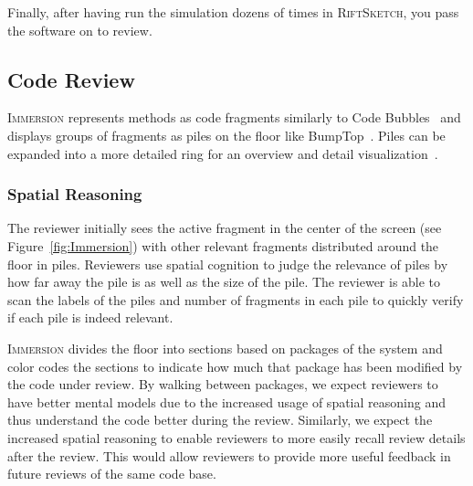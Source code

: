 \documentclass[conference]{IEEEtran}
\begin{document}
Finally, after having run the simulation dozens of times in \textsc{RiftSketch}, you pass the software on to review.




\subsection{Code Review}


\textsc{Immersion} represents methods as code fragments similarly to Code Bubbles~\cite{Bragdon:CodeBubbles} and displays groups of fragments as piles on the floor like BumpTop~\cite{Agarawala:BumpTop}.
Piles can be expanded into a more detailed ring for an overview and detail visualization~\cite{Shneiderman:InfoVisTaxonomy}.






\subsubsection{Spatial Reasoning}

The reviewer initially sees the active fragment in the center of the screen (see Figure~\ref{fig:Immersion}) with other relevant fragments distributed around the floor in piles. 
Reviewers use spatial cognition to judge the relevance of piles by how far away the pile is as well as the size of the pile.
The reviewer is able to scan the labels of the piles and number of fragments in each pile to quickly verify if each pile is indeed relevant.



\textsc{Immersion} divides the floor into sections based on packages of the system and color codes the sections to indicate how much that package has been modified by the code under review.
By walking between packages, we expect reviewers to have better mental models due to the increased usage of spatial reasoning and thus understand the code better during the review.
Similarly, we expect the increased spatial reasoning to enable reviewers to more easily recall review details after the review.
This would allow reviewers to provide more useful feedback in future reviews of the same code base.
\end{document}
